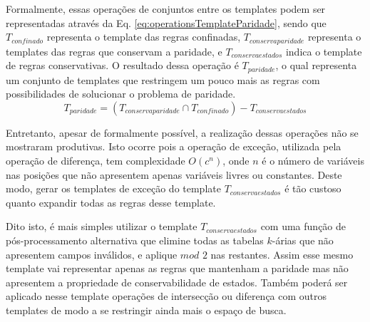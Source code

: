 Formalmente, essas operações de conjuntos entre os templates podem ser representadas através da Eq. \eqref{eq:operationsTemplateParidade}, sendo que $T_{confinado}$ representa o template das regras confinadas, $T_{conservaparidade}$ representa o templates das regras que conservam a paridade, e ${T}_{conservaestados}$ indica o template de regras conservativas. O resultado dessa operação é $T_{paridade}$, o qual representa um conjunto de templates que restringem um pouco mais as regras com possibilidades de solucionar o problema de paridade.
\begin{equation}
T_{paridade} = (T_{conservaparidade} \cap T_{confinado}) - {T}_{conservaestados}
\label{eq:operationsTemplateParidade}
\end{equation}

Entretanto, apesar de formalmente possível, a realização dessas operações não se mostraram produtivas. Isto ocorre pois  a operação de exceção, utilizada pela operação de diferença, tem complexidade $O(c^n)$, onde $n$ é o número de variáveis nas posições que não apresentem apenas variáveis livres ou constantes. Deste modo, gerar os templates de exceção do template $T_{conservaestados}$ é tão custoso quanto expandir todas as regras desse template.

Dito isto, é mais simples utilizar o template $T_{conservaestados}$ com uma função de pós-processamento alternativa que elimine todas as tabelas $k$-árias que não apresentem campos inválidos, e aplique $mod$ $2$ nas restantes. Assim  esse mesmo template vai representar apenas as regras que mantenham a paridade mas não apresentem a propriedade de conservabilidade de estados. Também poderá ser aplicado nesse template operações de intersecção ou diferença com outros templates de modo a se restringir ainda mais o espaço de busca.